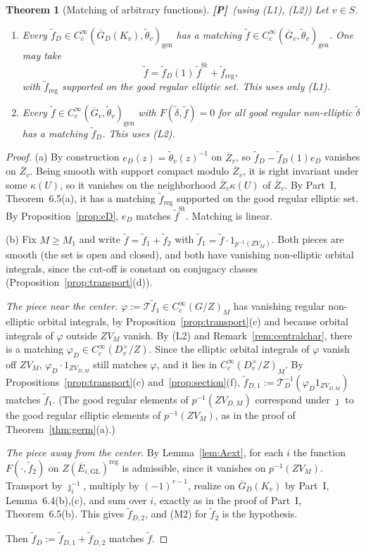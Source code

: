 \documentclass[12pt]{article}
\newcommand{\ov}[1]{\overline{#1}}
\newcommand{\gen}{\mathrm{gen}}
\newcommand{\reg}{\mathrm{reg}}
\newcommand{\GL}{\mathrm{GL}}
\newcommand{\St}{\mathrm{St}}
\newcommand{\Gb}{\ov{G}}
\newcommand{\Zb}{\ov{Z}}
\newcommand{\GDb}{\ov{G}_D}
\newcommand{\Eb}{\ov{E}}
\newcommand{\jj}{\jmath}
\newcommand{\Pv}{\textbf{[P]}}
\theoremstyle{plain}
\newtheorem{theorem}{Theorem}[section]
\theoremstyle{definition}
\begin{document}
\begin{theorem}[Matching of arbitrary functions]\label{thm:matching}\Pv\ (using (L1), (L2))
Let $v\in S$.
\begin{enumerate}[label=(\alph*)]
\item Every $\tilde f_D\in C_c^\infty(\GDb(K_v),\tilde\theta_v)_\gen$ has a matching $\tilde f\in C_c^\infty(\Gb_v,\tilde\theta_v)_\gen$. One may take
\[ \tilde f=\tilde f_D(1)\,\tilde f^{\St}+\tilde f_{\reg}, \]
with $\tilde f_{\reg}$ supported on the good regular elliptic set. This uses only (L1).
\item Every $\tilde f\in C_c^\infty(\Gb_v,\tilde\theta_v)_\gen$ with $F(\tilde\delta,\tilde f)=0$ for all good regular non-elliptic $\tilde\delta$ has a matching $\tilde f_D$. This uses (L2).
\end{enumerate}
\end{theorem}
\begin{proof}
(a) By construction $e_D(z)=\tilde\theta_v(z)^{-1}$ on $\Zb_v$, so $\tilde f_D-\tilde f_D(1)e_D$ vanishes on $\Zb_v$. Being smooth with support compact modulo $\Zb_v$, it is right invariant under some $\kappa(U)$, so it vanishes on the neighborhood $\Zb_v\kappa(U)$ of $\Zb_v$. By Part~I, Theorem~6.5(a), it has a matching $\tilde f_{\reg}$ supported on the good regular elliptic set. By Proposition~\ref{prop:eD}, $e_D$ matches $\tilde f^{\St}$. Matching is linear.

(b) Fix $M\ge M_1$ and write $\tilde f=\tilde f_1+\tilde f_2$ with $\tilde f_1=\tilde f\cdot1_{p^{-1}(ZV_M)}$. Both pieces are smooth (the set is open and closed), and both have vanishing non-elliptic orbital integrals, since the cut-off is constant on conjugacy classes (Proposition~\ref{prop:transport}(d)).

\emph{The piece near the center.} $\varphi:=\mathcal T\tilde f_1\in C_c^\infty(G/Z)_M$ has vanishing regular non-elliptic orbital integrals, by Proposition~\ref{prop:transport}(c) and because orbital integrals of $\varphi$ outside $ZV_M$ vanish. By (L2) and Remark~\ref{rem:centralchar}, there is a matching $\varphi_D\in C_c^\infty(D_v^\times/Z)$. Since the elliptic orbital integrals of $\varphi$ vanish off $ZV_M$, $\varphi_D\cdot1_{ZV_{D,M}}$ still matches $\varphi$, and it lies in $C_c^\infty(D_v^\times/Z)_M$. By Propositions~\ref{prop:transport}(c) and~\ref{prop:section}(f), $\tilde f_{D,1}:=\mathcal T_D^{-1}(\varphi_D1_{ZV_{D,M}})$ matches $\tilde f_1$. (The good regular elements of $p^{-1}(ZV_{D,M})$ correspond under $\jj$ to the good regular elliptic elements of $p^{-1}(ZV_M)$, as in the proof of Theorem~\ref{thm:germ}(a).)

\emph{The piece away from the center.} By Lemma~\ref{lem:Aext}, for each $i$ the function $F(\cdot,\tilde f_2)$ on $Z(\Eb_{i,\GL})^{\reg}$ is admissible, since it vanishes on $p^{-1}(ZV_M)$. Transport by $\jj_i^{-1}$, multiply by $(-1)^{r-1}$, realize on $\GDb(K_v)$ by Part~I, Lemma~6.4(b),(c), and sum over $i$, exactly as in the proof of Part~I, Theorem~6.5(b). This gives $\tilde f_{D,2}$, and (M2) for $\tilde f_2$ is the hypothesis.

Then $\tilde f_D:=\tilde f_{D,1}+\tilde f_{D,2}$ matches $\tilde f$.
\end{proof}
\end{document}
